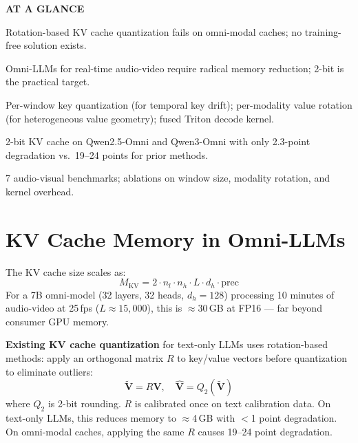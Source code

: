\documentclass[10pt,twocolumn]{article}
\begin{document}
\begin{mdframed}[backgroundcolor=boxgray,linecolor=rulered,linewidth=1pt,
    innerleftmargin=6pt,innerrightmargin=6pt,
    innertopmargin=6pt,innerbottommargin=6pt]
\textbf{\small AT A GLANCE}\par\vspace{4pt}
\begin{description}[leftmargin=0pt,labelsep=4pt,itemsep=2pt,parsep=0pt,
    font=\small\bfseries]
  \item[Problem:] Rotation-based KV cache quantization fails on
    omni-modal caches; no training-free solution exists.
  \item[Why it matters:] Omni-LLMs for real-time audio-video require
    radical memory reduction; 2-bit is the practical target.
  \item[Method:] Per-window key quantization (for temporal key drift);
    per-modality value rotation (for heterogeneous value geometry);
    fused Triton decode kernel.
  \item[Result:] 2-bit KV cache on Qwen2.5-Omni and Qwen3-Omni with
    only 2.3-point degradation vs.\ 19--24 points for prior methods.
  \item[Evidence:] 7 audio-visual benchmarks; ablations on window size,
    modality rotation, and kernel overhead.
\end{description}
\end{mdframed}

\section{KV Cache Memory in Omni-LLMs}

The KV cache size scales as:
\[
  M_{\mathrm{KV}} = 2 \cdot n_l \cdot n_h \cdot L \cdot d_h \cdot \text{prec}
\]
For a 7B omni-model (32 layers, 32 heads, $d_h = 128$) processing
10 minutes of audio-video at 25\,fps ($L \approx 15{,}000$), this is
$\approx$30\,GB at FP16 --- far beyond consumer GPU memory.

\textbf{Existing KV cache quantization} for text-only LLMs uses
rotation-based methods: apply an orthogonal matrix $R$ to key/value
vectors before quantization to eliminate outliers:
\[
  \tilde{\mathbf{V}} = R\mathbf{V}, \quad
  \hat{\mathbf{V}} = Q_2(\tilde{\mathbf{V}})
\]
where $Q_2$ is 2-bit rounding. $R$ is calibrated once on text
calibration data. On text-only LLMs, this reduces memory to
$\approx$4\,GB with $<$1 point degradation. On omni-modal caches,
applying the same $R$ causes 19--24 point degradation.
\end{document}

